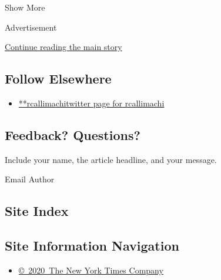 Show More

Advertisement

\protect\hyperlink{after-mid2}{Continue reading the main story}

\hypertarget{follow-elsewhere}{%
\subsection{Follow Elsewhere}\label{follow-elsewhere}}

\begin{itemize}
\tightlist
\item
  \href{https://twitter.com/rcallimachi}{**rcallimachitwitter page for
  rcallimachi}
\end{itemize}

\hypertarget{feedback-questions}{%
\subsection{Feedback? Questions?}\label{feedback-questions}}

Include your name, the article headline, and your message.

Email Author

\hypertarget{site-index}{%
\subsection{Site Index}\label{site-index}}

\hypertarget{site-information-navigation}{%
\subsection{Site Information
Navigation}\label{site-information-navigation}}

\begin{itemize}
\tightlist
\item
  \href{https://help.nytimes3xbfgragh.onion/hc/en-us/articles/115014792127-Copyright-notice}{©~2020~The
  New York Times Company}
\end{itemize}

